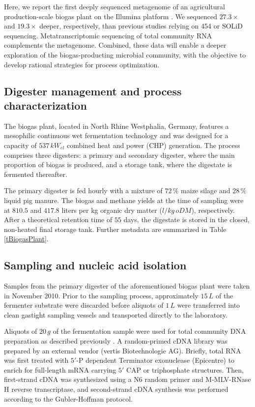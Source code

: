\documentclass{bmcart}
\begin{document}
Here, we report the first deeply sequenced metagenome of an agricultural production-scale biogas plant on the Illumina platform \cite{GigaScience}.
We sequenced $27.3 \times$ and $19.3 \times$ deeper, respectively, than previous studies relying on 454 \cite{Jaenicke2011} or SOLiD \cite{Wirth2012} sequencing. Metatranscriptomic sequencing of total community RNA complements the metagenome.
Combined, these data will enable a deeper exploration of the biogas-producting microbial community, with the objective to develop rational strategies for process optimization.

\subsection*{Digester management and process characterization}
The biogas plant, located in North Rhine Westphalia, Germany, features a mesophilic continuous wet fermentation technology and was designed for a capacity of $537\,kW_{el}$ combined heat and power (CHP) generation.
The process comprises three digesters: a primary and secondary digester, where the main proportion of biogas is produced, and a storage tank, where the digestate is fermented thereafter.

The primary digester is fed hourly with a mixture of $72\,\%$ maize silage and $28\,\%$ liquid pig manure.
The biogas and methane yields at the time of sampling were at $810.5$ and $417.8$ liters per kg organic dry matter ($l / kg\,oDM$), respectively.
After a theoretical retention time of $55$ days, the digestate is stored in the closed, non-heated final storage tank.
Further metadata are summarized in Table \ref{tBiogasPlant}.

\subsection*{Sampling and nucleic acid isolation}
Samples from the primary digester of the aforementioned biogas plant were taken in November 2010.
Prior to the sampling process, approximately $15\,L$ of the fermenter substrate were discarded before aliquots of $1\,L$ were transferred into clean gastight sampling vessels and transported directly to the laboratory.

Aliquots of $20\,g$ of the fermentation sample were used for total community DNA preparation as described previously \cite{Schlueter2008}. A random-primed cDNA library was prepared by an external vendor (vertis Biotechnologie AG). Briefly, total RNA was first treated with $5'$-P dependent Terminator exonuclease (Epicentre) to enrich for full-length mRNA carrying $5'$ CAP or triphosphate structures. Then, first-strand cDNA was synthesized using a N6 random primer and M-MLV-RNase H reverse transcriptase, and second-strand cDNA synthesis was performed according to the Gubler-Hoffman protocol.
\end{document}
